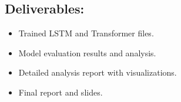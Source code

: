 \documentclass{article}
\begin{document}
\subsection*{Deliverables:}
\begin{itemize}
    \item Trained LSTM and Transformer files.
    \item Model evaluation results and analysis.
    \item Detailed analysis report with visualizations.
    \item Final report and slides.
\end{itemize}
\end{document}
